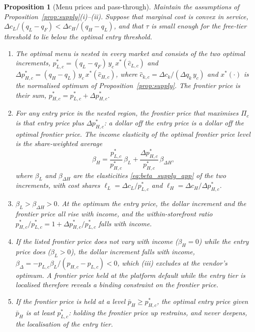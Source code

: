 \documentclass[11pt]{article}
\newtheorem{aproposition}{Proposition}[section]
\theoremstyle{definition}
\theoremstyle{remark}
\begin{document}
\begin{aproposition}[Menu prices and pass-through]\label{prop:menu}
Maintain the assumptions of Proposition~\ref{prop:supply}(i)--(ii). Suppose that marginal cost is convex in service, $\Delta c_L/(q_L-q_F)<\Delta c_H/(q_H-q_L)$, and that $\tau$ is small enough for the free-tier threshold to lie below the optimal entry threshold.
\begin{enumerate}[label=(\roman*),leftmargin=*]
\item The optimal menu is nested in every market and consists of the two optimal increments, $p^*_{L,c}=(q_L-q_F)\,y_c\,x^*(\hat c_{L,c})$ and $\Delta p^*_{H,c}=(q_H-q_L)\,y_c\,x^*(\hat c_{H,c})$, where $\hat c_{k,c}=\Delta c_k/(\Delta q_k\,y_c)$ and $x^*(\cdot)$ is the normalised optimum of Proposition~\ref{prop:supply}. The frontier price is their sum, $p^*_{H,c}=p^*_{L,c}+\Delta p^*_{H,c}$.
\item For any entry price in the nested region, the frontier price that maximises $\Pi_c$ is that entry price plus $\Delta p^*_{H,c}$: a dollar off the entry price is a dollar off the optimal frontier price. The income elasticity of the optimal frontier price level is the share-weighted average
\begin{equation}
 \beta_H=\frac{p^*_{L,c}}{p^*_{H,c}}\,\beta_L+\frac{\Delta p^*_{H,c}}{p^*_{H,c}}\,\beta_{\Delta H},
 \label{eq:beta_level}
\end{equation}
where $\beta_L$ and $\beta_{\Delta H}$ are the elasticities \eqref{eq:beta_supply_app} of the two increments, with cost shares $\ell_L=\Delta c_L/p^*_{L,c}$ and $\ell_H=\Delta c_H/\Delta p^*_{H,c}$.
\item $\beta_L>\beta_{\Delta H}>0$. At the optimum the entry price, the dollar increment and the frontier price all rise with income, and the within-storefront ratio $p^*_{H,c}/p^*_{L,c}=1+\Delta p^*_{H,c}/p^*_{L,c}$ falls with income.
\item If the listed frontier price does not vary with income ($\beta_H=0$) while the entry price does ($\beta_L>0$), the dollar increment falls with income, $\beta_\Delta=-p_{L,c}\beta_L/(p_{H,c}-p_{L,c})<0$, which (iii) excludes at the vendor's optimum. A frontier price held at the platform default while the entry tier is localised therefore reveals a binding constraint on the frontier price.
\item If the frontier price is held at a level $\bar p_H\ge p^*_{H,c}$, the optimal entry price given $\bar p_H$ is at least $p^*_{L,c}$: holding the frontier price up restrains, and never deepens, the localisation of the entry tier.
\end{enumerate}
\end{aproposition}
\end{document}
